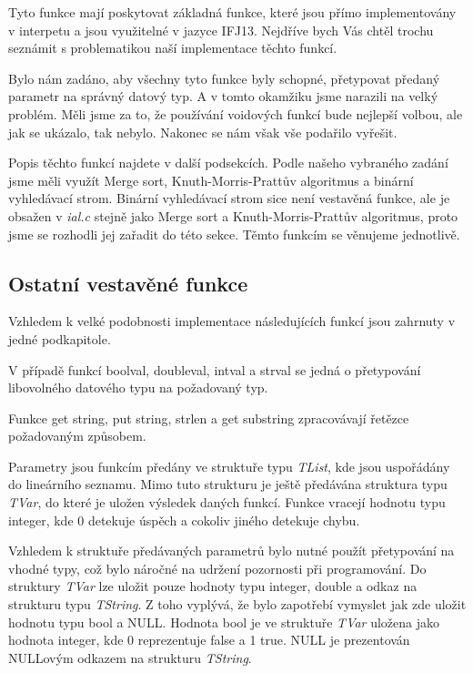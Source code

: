 \documentclass[12pt,a4paper,titlepage,final]{article}
\begin{document}
Tyto funkce mají poskytovat základná funkce, které jsou přímo implementovány v interpetu a jsou využitelné
v jazyce IFJ13. Nejdříve bych Vás chtěl trochu seznámit s problematikou naší implementace těchto funkcí. 

Bylo nám zadáno, aby všechny tyto funkce byly schopné, přetypovat předaný parametr na správný datový typ. 
A v tomto okamžiku jsme narazili na velký problém. Měli jsme za to, že používání voidových funkcí bude nejlepší 
volbou, ale jak se ukázalo, tak nebylo. Nakonec se nám však vše podařilo vyřešit.

Popis těchto funkcí najdete v další podsekcích. Podle našeho vybraného zadání jsme měli využít Merge sort, 
Knuth-Morris-Prattův algoritmus a binární vyhledávací strom. Binární vyhledávací strom sice není vestavěná 
funkce, ale je obsažen v \textit{ial.c} stejně jako Merge sort a Knuth-Morris-Prattův algoritmus, proto jsme 
se rozhodli jej zařadit do této sekce. Těmto funkcím se věnujeme jednotlivě.

\subsection{Ostatní vestavěné funkce}

Vzhledem k velké podobnosti implementace následujících funkcí jsou zahrnuty v jedné podkapitole.

V případě funkcí boolval, doubleval, intval a strval se jedná o přetypování libovolného datového typu
na požadovaný typ. 

Funkce get string, put string, strlen a get substring zpracovávají řetězce požadovaným způsobem.

Parametry jsou funkcím předány ve struktuře typu \textit{TList}, kde jsou uspořádány do lineárního seznamu. 
Mimo tuto strukturu je ještě předávána struktura typu \textit{TVar}, do které je uložen výsledek daných funkcí. 
Funkce vracejí hodnotu typu integer, kde 0 detekuje úspěch a cokoliv jiného detekuje chybu. 

Vzhledem k struktuře předávaných parametrů bylo nutné použít přetypování na vhodné typy, což bylo náročné na 
udržení pozornosti při programování. Do struktury \textit{TVar} lze uložit pouze hodnoty typu integer, 
double a odkaz na strukturu typu \textit{TString}. Z toho vyplývá, že bylo zapotřebí vymyslet jak zde uložit 
hodnotu typu bool a NULL.
Hodnota bool je ve struktuře \textit{TVar} uložena jako hodnota integer, kde 0 reprezentuje false a 1 true. 
NULL je prezentován NULLovým odkazem na strukturu \textit{TString}.
\end{document}
